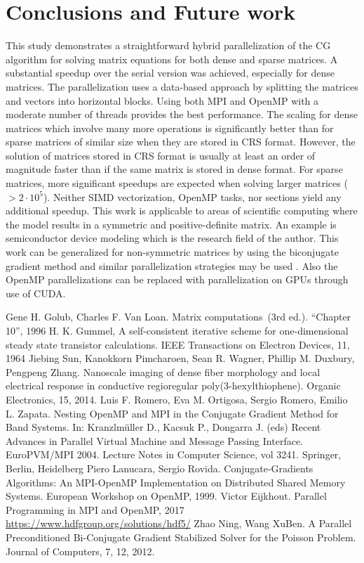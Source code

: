 \documentclass{article}
\begin{document}
\section{Conclusions and Future work}
This study demonstrates a straightforward hybrid parallelization of the CG algorithm for solving matrix equations for both dense and sparse matrices. A substantial speedup over the serial version was achieved, especially for dense matrices. The parallelization uses a data-based approach by splitting the matrices and vectors into horizontal blocks. Using both MPI and OpenMP with a moderate number of threads provides the best performance. The scaling for dense matrices which involve many more operations is significantly better than for sparse matrices of similar size when they are stored in CRS format. However, the solution of matrices stored in CRS format is usually at least an order of magnitude faster than if the same matrix is stored in dense format. For sparse matrices, more significant speedups are expected when solving larger matrices ($>2 \cdot 10^{5}$). Neither SIMD vectorization, OpenMP tasks, nor sections yield any additional speedup. This work is applicable to areas of scientific computing where the model results in a symmetric and positive-definite matrix. An example is semiconductor device modeling which is the research field of the author. This work can be generalized for non-symmetric matrices by using the biconjugate gradient method and similar parallelization strategies may be used \cite{Ning}. Also the OpenMP parallelizations can be replaced with parallelization on GPUs through use of CUDA.

\begin{thebibliography}{4}
	 Gene H. Golub,  Charles F. Van Loan. Matrix computations (3rd ed.). “Chapter 10”, 1996
	 H. K. Gummel, A self-consistent iterative scheme for one-dimensional steady state transistor calculations. IEEE Transactions on Electron Devices, 11, 1964
	 Jiebing Sun, Kanokkorn Pimcharoen, Sean R. Wagner, Phillip M. Duxbury, Pengpeng Zhang. Nanoscale imaging of dense fiber morphology and local electrical response in conductive regioregular poly(3-hexylthiophene). Organic Electronics, 15, 2014.
	 Luis F. Romero, Eva M. Ortigosa, Sergio Romero, Emilio L. Zapata. Nesting OpenMP and MPI in the Conjugate Gradient Method for Band Systems. In: Kranzlmüller D., Kacsuk P., Dongarra J. (eds) Recent Advances in Parallel Virtual Machine and Message Passing Interface. EuroPVM/MPI 2004. Lecture Notes in Computer Science, vol 3241. Springer, Berlin, Heidelberg
	 Piero Lanucara, Sergio Rovida. Conjugate-Gradients Algorithms: An MPI-OpenMP Implementation on Distributed Shared Memory Systems. European Workshop on OpenMP, 1999.	
	 Victor Eijkhout. Parallel Programming in MPI and OpenMP, 2017
	 \url{https://www.hdfgroup.org/solutions/hdf5/}
	 Zhao Ning, Wang XuBen. A Parallel Preconditioned Bi-Conjugate Gradient Stabilized Solver for the Poisson Problem. Journal of Computers, 7, 12, 2012.
\end{thebibliography}
\end{document}
